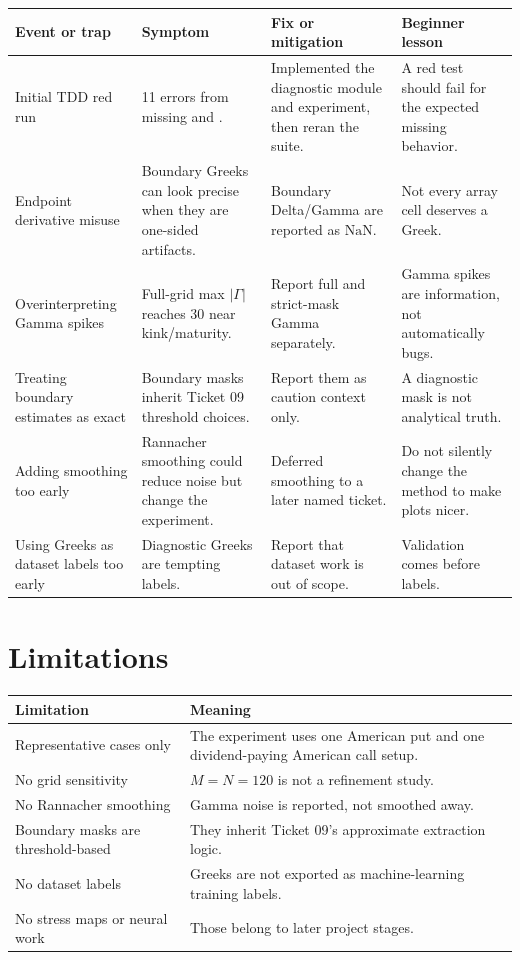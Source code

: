 \documentclass[11pt,a4paper]{article}
\begin{document}
{\small
\setlength{\tabcolsep}{3pt}
\begin{longtable}{P{0.25\textwidth}L{0.23\textwidth}L{0.23\textwidth}L{0.17\textwidth}}
\toprule
Event or trap & Symptom & Fix or mitigation & Beginner lesson \\
\midrule
\endhead
Initial TDD red run & 11 errors from missing  and . & Implemented the diagnostic module and experiment, then reran the suite. & A red test should fail for the expected missing behavior. \\
Endpoint derivative misuse & Boundary Greeks can look precise when they are one-sided artifacts. & Boundary Delta/Gamma are reported as \(\mathrm{NaN}\). & Not every array cell deserves a Greek. \\
Overinterpreting Gamma spikes & Full-grid max \(|\Gamma|\) reaches 30 near kink/maturity. & Report full and strict-mask Gamma separately. & Gamma spikes are information, not automatically bugs. \\
Treating boundary estimates as exact & Boundary masks inherit Ticket 09 threshold choices. & Report them as caution context only. & A diagnostic mask is not analytical truth. \\
Adding smoothing too early & Rannacher smoothing could reduce noise but change the experiment. & Deferred smoothing to a later named ticket. & Do not silently change the method to make plots nicer. \\
Using Greeks as dataset labels too early & Diagnostic Greeks are tempting labels. & Report that dataset work is out of scope. & Validation comes before labels. \\
\bottomrule
\end{longtable}
}

\section{Limitations}

\begin{longtable}{P{0.32\textwidth}L{0.50\textwidth}}
\toprule
Limitation & Meaning \\
\midrule
\endhead
Representative cases only & The experiment uses one American put and one dividend-paying American call setup. \\
No grid sensitivity & \(M=N=120\) is not a refinement study. \\
No Rannacher smoothing & Gamma noise is reported, not smoothed away. \\
Boundary masks are threshold-based & They inherit Ticket 09's approximate extraction logic. \\
No dataset labels & Greeks are not exported as machine-learning training labels. \\
No stress maps or neural work & Those belong to later project stages. \\
\bottomrule
\end{longtable}
\end{document}
